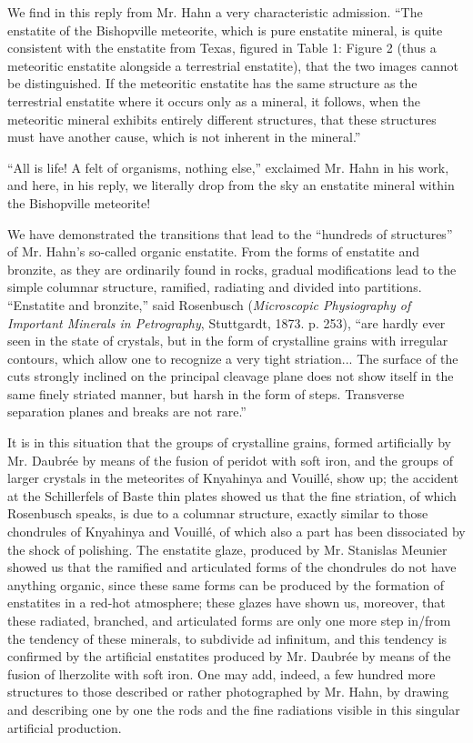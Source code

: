 \documentclass[a4paper, 12pt, oneside]{article}
\begin{document}
We find in this reply from Mr. Hahn a very characteristic admission. ``The enstatite of the Bishopville meteorite, which is pure enstatite mineral, is quite consistent with the enstatite from Texas, figured in Table 1: Figure 2 (thus a meteoritic enstatite alongside a terrestrial enstatite), that the two images cannot be distinguished. If the meteoritic enstatite has the same structure as the terrestrial enstatite where it occurs only as a mineral, it follows, when the meteoritic mineral exhibits entirely different structures, that these structures must have another cause, which is not inherent in the mineral.''

``All is life! A felt of organisms, nothing else,'' exclaimed Mr. Hahn in his work, and here, in his reply, we literally drop from the sky an enstatite mineral within the Bishopville meteorite!

We have demonstrated the transitions that lead to the ``hundreds of structures'' of Mr. Hahn's so-called organic enstatite. From the forms of enstatite and bronzite, as they are ordinarily found in rocks, gradual modifications lead to the simple columnar structure, ramified, radiating and divided into partitions. ``Enstatite and bronzite,'' said Rosenbusch (\emph{Microscopic Physiography of Important Minerals in Petrography}, Stuttgardt, 1873. p. 253), ``are hardly ever seen in the state of crystals, but in the form of crystalline grains with irregular contours, which allow one to recognize a very tight striation... The surface of the cuts strongly inclined on the principal cleavage plane does not show itself in the same finely striated manner, but harsh in the form of steps. Transverse separation planes and breaks are not rare.''

It is in this situation that the groups of crystalline grains, formed artificially by Mr. Daubrée by means of the fusion of peridot with soft iron, and the groups of larger crystals in the meteorites of Knyahinya and Vouillé, show up; the accident at the Schillerfels of Baste thin plates showed us that the fine striation, of which Rosenbusch speaks, is due to a columnar structure, exactly similar to those chondrules of Knyahinya and Vouillé, of which also a part has been dissociated by the shock of polishing. The enstatite glaze, produced by Mr. Stanislas Meunier showed us that the ramified and articulated forms of the chondrules do not have anything organic, since these same forms can be produced by the formation of enstatites in a red-hot atmosphere; these glazes have shown us, moreover, that these radiated, branched, and articulated forms are only one more step in/from the tendency of these minerals, to subdivide ad infinitum, and this tendency is confirmed by the artificial enstatites produced by Mr. Daubrée by means of the fusion of lherzolite with soft iron. One may add, indeed, a few hundred more structures to those described or rather photographed by Mr. Hahn, by drawing and describing one by one the rods and the fine radiations visible in this singular artificial production.
\end{document}
